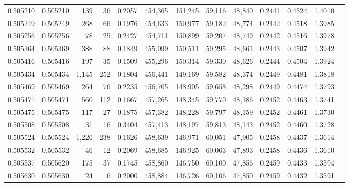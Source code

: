 \begin{tabular}{rrrrrrrrrrrrr}
0.505210 & 0.505210 &   139 &    36 &                                     0.2057 & 454,365 & 151,245 &  59,116 &  48,840 & 0.2441 & 0.4524 & 1.4010 \\
0.505249 & 0.505249 &   268 &    66 &                                     0.1976 & 454,633 & 150,977 &  59,182 &  48,774 & 0.2442 & 0.4518 & 1.3985 \\
0.505256 & 0.505256 &    78 &    25 &                                     0.2427 & 454,711 & 150,899 &  59,207 &  48,749 & 0.2442 & 0.4516 & 1.3978 \\
0.505364 & 0.505369 &   388 &    88 &                                     0.1849 & 455,099 & 150,511 &  59,295 &  48,661 & 0.2443 & 0.4507 & 1.3942 \\
0.505416 & 0.505416 &   197 &    35 &                                     0.1509 & 455,296 & 150,314 &  59,330 &  48,626 & 0.2444 & 0.4504 & 1.3924 \\
0.505434 & 0.505434 & 1,145 &   252 &                                     0.1804 & 456,441 & 149,169 &  59,582 &  48,374 & 0.2449 & 0.4481 & 1.3818 \\
0.505469 & 0.505469 &   264 &    76 &                                     0.2235 & 456,705 & 148,905 &  59,658 &  48,298 & 0.2449 & 0.4474 & 1.3793 \\
0.505471 & 0.505471 &   560 &   112 &                                     0.1667 & 457,265 & 148,345 &  59,770 &  48,186 & 0.2452 & 0.4463 & 1.3741 \\
0.505475 & 0.505475 &   117 &    27 &                                     0.1875 & 457,382 & 148,228 &  59,797 &  48,159 & 0.2452 & 0.4461 & 1.3730 \\
0.505508 & 0.505508 &    31 &    16 &                                     0.3404 & 457,413 & 148,197 &  59,813 &  48,143 & 0.2452 & 0.4460 & 1.3728 \\
0.505524 & 0.505524 & 1,226 &   238 &                                     0.1626 & 458,639 & 146,971 &  60,051 &  47,905 & 0.2458 & 0.4437 & 1.3614 \\
0.505532 & 0.505532 &    46 &    12 &                                     0.2069 & 458,685 & 146,925 &  60,063 &  47,893 & 0.2458 & 0.4436 & 1.3610 \\
0.505537 & 0.505620 &   175 &    37 &                                     0.1745 & 458,860 & 146,750 &  60,100 &  47,856 & 0.2459 & 0.4433 & 1.3594 \\
0.505630 & 0.505630 &    24 &     6 &                                     0.2000 & 458,884 & 146,726 &  60,106 &  47,850 & 0.2459 & 0.4432 & 1.3591 \\

\end{tabular}
